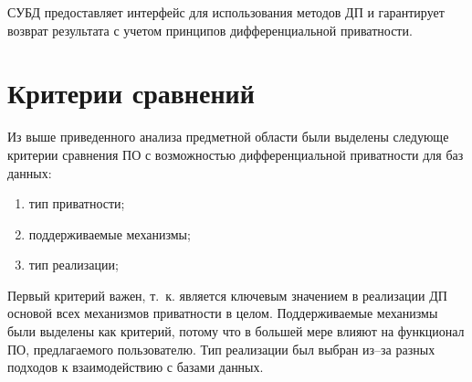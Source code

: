 СУБД предоставляет интерфейс для использования методов ДП и гарантирует возврат результата с учетом принципов дифференциальной приватности.~\cite{main}






\section{Критерии сравнений}

Из выше приведенного анализа предметной области были выделены следующе критерии сравнения ПО с возможностью дифференциальной приватности для баз данных:
\begin{enumerate}[label*=---]
	\item тип приватности; 
	\item поддерживаемые механизмы;
	\item тип реализации;
\end{enumerate}
Первый критерий важен, т.~к. является ключевым значением в реализации ДП основой всех механизмов приватности в целом.
Поддерживаемые механизмы были выделены как критерий, потому что в большей мере влияют на функционал ПО, предлагаемого пользователю.
Тип реализации был выбран из--за разных подходов к взаимодействию с базами данных.


